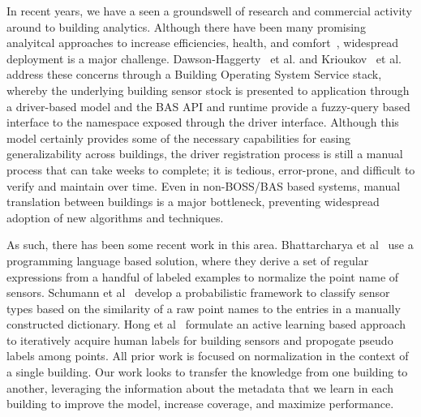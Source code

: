 In recent years, we have a seen a groundswell of research and commercial activity around to building
analytics\cite{}.  Although there have been many promising analyitcal approaches to increase
efficiencies, health, and comfort~\cite{}, widespread deployment is a major challenge.  Dawson-Haggerty~\cite{boss} et al.
and Krioukov~\cite{bas} et al. address these concerns through a Building Operating System Service stack, whereby
the underlying building sensor stock is presented to application through a driver-based model and the 
BAS API and runtime provide a fuzzy-query based interface to the namespace exposed through the driver interface.
Although this model certainly provides some of the necessary capabilities for easing generalizability across
buildings, the driver registration process is still a manual process that can take weeks to complete;
it is tedious, error-prone, and difficult to verify and maintain over time.  Even in non-BOSS/BAS based systems, manual
translation between buildings is a major bottleneck, preventing widespread adoption of new algorithms and techniques.

As such, there has been some recent work in this area.
Bhattarcharya et al~\cite{arka} use a programming language based solution, 
where they derive a set of regular expressions from a handful of labeled examples 
to normalize the point name of sensors. 
Schumann et al~\cite{ibm} develop a probabilistic framework to classify sensor types 
based on the similarity of a raw point names to the entries in a manually constructed dictionary. 
Hong et al~\cite{cikm} formulate an active learning based approach to iteratively 
acquire human labels for building sensors and propogate pseudo labels among points.
All prior work is focused on normalization in the context of a single building.  Our work looks to 
transfer the knowledge from one building to another, leveraging the information about the metadata that
we learn in each building to improve the model, increase coverage, and maximize performance.



